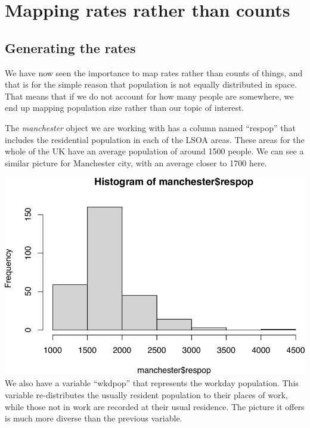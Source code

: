 \documentclass[
]{book}
\newenvironment{Shaded}{\begin{snugshade}}{\end{snugshade}}
\newcommand{\FunctionTok}[1]{\textcolor[rgb]{0.00,0.00,0.00}{#1}}
\newcommand{\NormalTok}[1]{#1}
\newcommand{\SpecialCharTok}[1]{\textcolor[rgb]{0.00,0.00,0.00}{#1}}
\begin{document}
\hypertarget{mapping-rates-rather-than-counts}{%
\section{Mapping rates rather than counts}\label{mapping-rates-rather-than-counts}}

\hypertarget{generating-the-rates}{%
\subsection{Generating the rates}\label{generating-the-rates}}

We have now seen the importance to map rates rather than counts of things, and that is for the simple reason that population is not equally distributed in space. That means that if we do not account for how many people are somewhere, we end up mapping population size rather than our topic of interest.

The \emph{manchester} object we are working with has a column named ``respop'' that includes the residential population in each of the LSOA areas. These areas for the whole of the UK have an average population of around 1500 people. We can see a similar picture for Manchester city, with an average closer to 1700 here.

\begin{Shaded}
\end{Shaded}

\includegraphics{crime_mapping_files/figure-latex/unnamed-chunk-81-1.pdf}
We also have a variable ``wkdpop'' that represents the workday population. This variable re-distributes the usually resident population to their places of work, while those not in work are recorded at their usual residence. The picture it offers is much more diverse than the previous variable.
\end{document}
